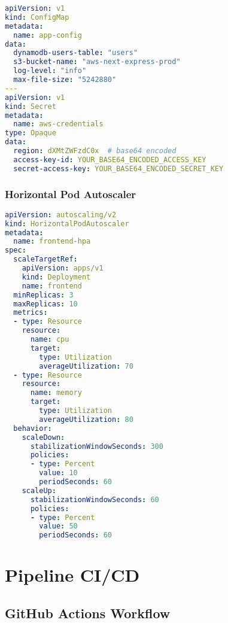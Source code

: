 \begin{lstlisting}[language=YAML, caption=k8s/configmap.yaml]
apiVersion: v1
kind: ConfigMap
metadata:
  name: app-config
data:
  dynamodb-users-table: "users"
  s3-bucket-name: "aws-next-express-prod"
  log-level: "info"
  max-file-size: "5242880"
---
apiVersion: v1
kind: Secret
metadata:
  name: aws-credentials
type: Opaque
data:
  region: dXMtZWFzdC0x  # base64 encoded
  access-key-id: YOUR_BASE64_ENCODED_ACCESS_KEY
  secret-access-key: YOUR_BASE64_ENCODED_SECRET_KEY
\end{lstlisting}

\subsubsection{Horizontal Pod Autoscaler}

\begin{lstlisting}[language=YAML, caption=k8s/hpa.yaml]
apiVersion: autoscaling/v2
kind: HorizontalPodAutoscaler
metadata:
  name: frontend-hpa
spec:
  scaleTargetRef:
    apiVersion: apps/v1
    kind: Deployment
    name: frontend
  minReplicas: 3
  maxReplicas: 10
  metrics:
  - type: Resource
    resource:
      name: cpu
      target:
        type: Utilization
        averageUtilization: 70
  - type: Resource
    resource:
      name: memory
      target:
        type: Utilization
        averageUtilization: 80
  behavior:
    scaleDown:
      stabilizationWindowSeconds: 300
      policies:
      - type: Percent
        value: 10
        periodSeconds: 60
    scaleUp:
      stabilizationWindowSeconds: 60
      policies:
      - type: Percent
        value: 50
        periodSeconds: 60
\end{lstlisting}

\section{Pipeline CI/CD}

\subsection{GitHub Actions Workflow}

